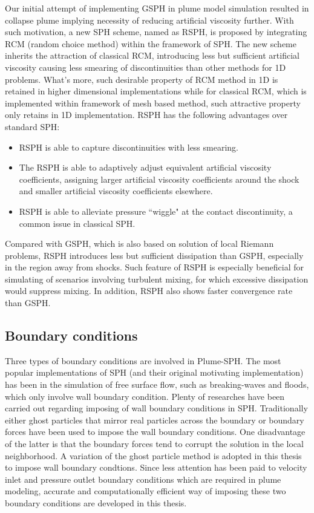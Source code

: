 Our initial attempt of implementing GSPH in plume model simulation resulted in collapse plume implying necessity of reducing artificial viscosity further. With such motivation, a new SPH scheme, named as RSPH, is proposed by integrating RCM (random choice method) within the framework of SPH. 
The new scheme inherits the attraction of classical RCM, introducing less but sufficient artificial viscosity causing less smearing of discontinuities than other methods for 1D problems. What's more, such desirable property of RCM method in 1D is retained in higher dimensional implementations while for classical RCM, which is implemented within framework of mesh based method, such attractive property only retains in 1D implementation. 
RSPH has the following advantages over standard SPH:
\begin{itemize}
\item RSPH is able to capture discontinuities with less smearing.
\item The RSPH is able to adaptively adjust equivalent artificial viscosity coefficients, assigning larger artificial viscosity coefficients around the shock and smaller artificial viscosity coefficients elsewhere.
\item RSPH is able to alleviate pressure ``wiggle" at the contact discontinuity, a common issue in classical SPH.
\end{itemize}
Compared with GSPH, which is also based on solution of local Riemann problems, RSPH introduces less but sufficient dissipation than GSPH, especially in the region away from shocks. Such feature of RSPH is especially beneficial for simulating of scenarios involving turbulent mixing, for which excessive dissipation would suppress mixing. In addition, RSPH also shows faster convergence rate than GSPH. 

\subsection{Boundary conditions}
Three types of boundary conditions are involved in Plume-SPH. The most popular implementations of SPH (and their original motivating implementation) has been in the simulation of free surface flow, such as breaking-waves and floods, which only involve wall boundary condition. Plenty of researches have been carried out regarding imposing of wall boundary conditions in SPH. Traditionally either ghost particles that mirror real particles across the boundary \citep {ferrari2009new} or boundary forces \citep {monaghan2009sph} have been used to impose the wall boundary conditions. One disadvantage of the latter  is that the boundary forces tend to corrupt the solution in the local neighborhood. A variation \citep {kumar2013parallel} of the ghost particle method is adopted in this thesis to impose wall boundary condtions. Since less attention has been paid to velocity inlet and pressure outlet boundary conditions which are required in plume modeling, accurate and computationally efficient way of imposing these two boundary conditions are developed in this thesis.

